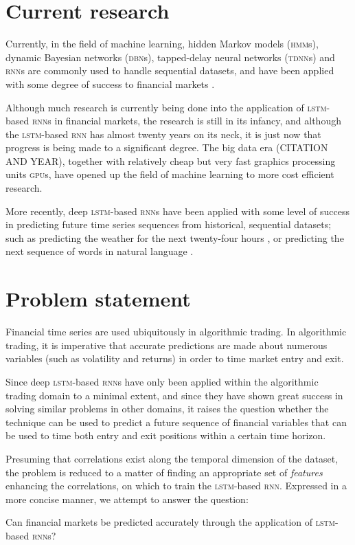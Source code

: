 \section{Current research}
Currently, in the field of machine learning, hidden Markov models
(\textsc{hmm}s), dynamic Bayesian networks (\textsc{dbn}s), tapped-delay neural
networks (\textsc{tdnn}s) and \textsc{rnn}s are commonly used to handle
sequential datasets, and have been applied with some degree of success to
financial markets \citep{saad1998,kita2012,zhang2004}.

Although much research is currently being done into the application of
\textsc{lstm}-based \textsc{rnn}s in financial markets, the research is still in
its infancy, and although the \textsc{lstm}-based \textsc{rnn} has almost twenty
years on its neck, it is just now that progress is being made to a significant
degree.  The big data era (CITATION AND YEAR), together with relatively cheap
but very fast graphics processing units \textsc{gpu}s, have opened up the field
of machine learning to more cost efficient research.

More recently, deep \textsc{lstm}-based \textsc{rnn}s have been applied with
some level of success in predicting future time series sequences from
historical, sequential datasets; such as predicting the weather for the next
twenty-four hours \citep*{zaytar2016}, or predicting the next sequence of words
in natural language \citep*{quoc2014}.

\section{Problem statement}
Financial time series are used ubiquitously in algorithmic trading.  In
algorithmic trading, it is imperative that accurate predictions are made about
numerous variables (such as volatility and returns) in order to time market
entry and exit.

Since deep \textsc{lstm}-based \textsc{rnn}s have only been applied within the
algorithmic trading domain to a minimal extent, and since they have shown great
success in solving similar problems in other domains, it raises the question
whether the technique can be used to predict a future sequence of financial
variables that can be used to time both entry and exit positions within a
certain time horizon.

Presuming that correlations exist along the temporal dimension of the dataset,
the problem is reduced to a matter of finding an appropriate set of
\textit{features} enhancing the correlations, on which to train the
\textsc{lstm}-based \textsc{rnn}.  Expressed in a more concise manner, we
attempt to answer the question:

Can financial markets be predicted accurately through the application of
\textsc{lstm}-based \textsc{rnn}s?
